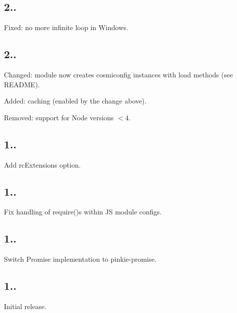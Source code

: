 \subsection*{2..}


\begin{DoxyItemize}
\item Fixed\+: no more infinite loop in Windows.
\end{DoxyItemize}

\subsection*{2..}


\begin{DoxyItemize}
\item Changed\+: module now creates cosmiconfig instances with {\ttfamily load} methods (see R\+E\+A\+D\+ME).
\item Added\+: caching (enabled by the change above).
\item Removed\+: support for Node versions $<$4.
\end{DoxyItemize}

\subsection*{1..}


\begin{DoxyItemize}
\item Add {\ttfamily rc\+Extensions} option.
\end{DoxyItemize}

\subsection*{1..}


\begin{DoxyItemize}
\item Fix handling of {\ttfamily require()}\textquotesingle{}s within JS module configs.
\end{DoxyItemize}

\subsection*{1..}


\begin{DoxyItemize}
\item Switch Promise implementation to pinkie-\/promise.
\end{DoxyItemize}

\subsection*{1..}


\begin{DoxyItemize}
\item Initial release. 
\end{DoxyItemize}
